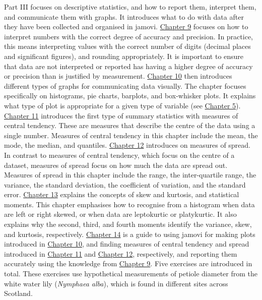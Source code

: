 \documentclass[
]{scrbook}
\begin{document}
Part III focuses on descriptive statistics, and how to report them, interpret them, and communicate them with graphs.
It introduces what to do with data after they have been collected and organised in jamovi.
\protect\hyperlink{Chapter_9}{Chapter 9} focuses on how to interpret numbers with the correct degree of accuracy and precision.
In practice, this means interpreting values with the correct number of digits (decimal places and significant figures), and rounding appropriately.
It is important to ensure that data are not interpreted or reported has having a higher degree of accuracy or precision than is justified by measurement.
\protect\hyperlink{Chapter_10}{Chapter 10} then introduces different types of graphs for communicating data visually.
The chapter focuses specifically on histograms, pie charts, barplots, and box-whisker plots.
It explains what type of plot is appropriate for a given type of variable (see \protect\hyperlink{Chapter_5}{Chapter 5}).
\protect\hyperlink{Chapter_11}{Chapter 11} introduces the first type of summary statistics with measures of central tendency.
These are measures that describe the centre of the data using a single number.
Measures of central tendency in this chapter include the mean, the mode, the median, and quantiles.
\protect\hyperlink{Chapter_12}{Chapter 12} introduces on measures of spread.
In contrast to measures of central tendency, which focus on the centre of a dataset, measures of spread focus on how much the data are spread out.
Measures of spread in this chapter include the range, the inter-quartile range, the variance, the standard deviation, the coefficient of variation, and the standard error.
\protect\hyperlink{Chapter_13}{Chapter 13} explains the concepts of skew and kurtosis, and statistical moments.
This chapter emphasises how to recognise from a histogram when data are left or right skewed, or when data are leptokurtic or platykurtic.
It also explains why the second, third, and fourth moments identify the variance, skew, and kurtosis, respectively.
\protect\hyperlink{Chapter_14}{Chapter 14} is a guide to using jamovi for making plots introduced in \protect\hyperlink{Chapter_10}{Chapter 10}, and finding measures of central tendency and spread introduced in \protect\hyperlink{Chapter_11}{Chapter 11} and \protect\hyperlink{Chapter_12}{Chapter 12}, respectively, and reporting them accurately using the knowledge from \protect\hyperlink{Chapter_9}{Chapter 9}.
Five exercises are introduced in total.
These exercises use hypothetical measurements of petiole diameter from the white water lily (\emph{Nymphaea alba}), which is found in different sites across Scotland.
\end{document}
